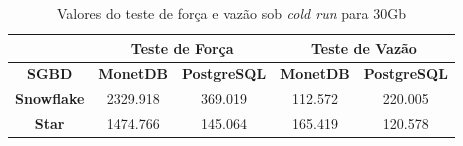 \begin{table}[htpb]
        \centering
        \caption{Valores do teste de força e vazão sob \textit{cold run} para 30Gb}
        \label{tab:forca_vazao_cold_30}
        \begin{tabular}{|c|c|c|c|c|}
        \hline
                                & \multicolumn{2}{c|}{\textbf{Teste de Força}} & \multicolumn{2}{c|}{\textbf{Teste de Vazão}} \\ \hline
        \textbf{SGBD}      & \textbf{MonetDB}    & \textbf{PostgreSQL}    & \textbf{MonetDB}    & \textbf{PostgreSQL}    \\ \hline
        \textbf{Snowflake} & 2329.918            & 369.019                & 112.572             & 220.005                \\ \hline
        \textbf{Star}      & 1474.766            & 145.064                & 165.419             & 120.578                \\ \hline
        \end{tabular}
\end{table}

